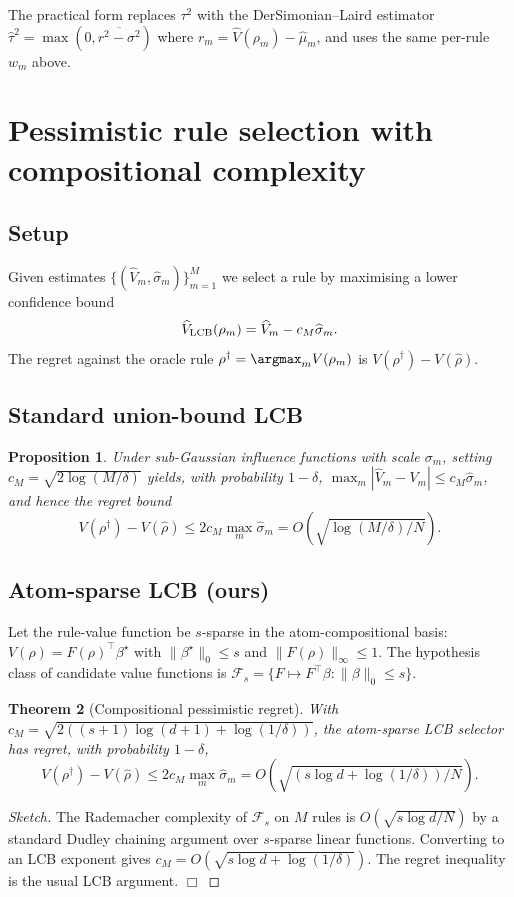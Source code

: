 \documentclass[11pt]{article}
\newtheorem{theorem}{Theorem}
\newtheorem{proposition}[theorem]{Proposition}
\begin{document}
The practical form replaces $\tau^2$ with the DerSimonian--Laird
estimator $\widehat\tau^2 = \max(0, \overline{r^2 - \sigma^2})$ where
$r_m = \widehat V(\rho_m) - \widehat\mu_m$, and uses the same
per-rule $w_m$ above.

\section{Pessimistic rule selection with compositional complexity}

\subsection{Setup}

Given estimates $\{(\widehat V_m, \widehat\sigma_m)\}_{m=1}^M$ we
select a rule by maximising a lower confidence bound
$$
\widehat V_{\rm LCB}(\rho_m) = \widehat V_m - c_M \widehat\sigma_m.
$$
The regret against the oracle rule $\rho^\dagger =
\argmax_m V(\rho_m)$ is $V(\rho^\dagger) - V(\widehat\rho)$.

\subsection{Standard union-bound LCB}

\begin{proposition}\label{prop:lcb-union}
Under sub-Gaussian influence functions with scale $\sigma_m$, setting
$c_M = \sqrt{2 \log(M/\delta)}$ yields, with probability $1 - \delta$,
$\max_m |\widehat V_m - V_m| \le c_M \widehat\sigma_m$, and hence the
regret bound
$$
V(\rho^\dagger) - V(\widehat\rho) \le 2 c_M \max_m \widehat\sigma_m = O\!\left(\sqrt{\log(M/\delta)/N}\right).
$$
\end{proposition}

\subsection{Atom-sparse LCB (ours)}

Let the rule-value function be $s$-sparse in the atom-compositional
basis: $V(\rho) = F(\rho)^\top \beta^\star$ with
$\|\beta^\star\|_0 \le s$ and $\|F(\rho)\|_\infty \le 1$.  The
hypothesis class of candidate value functions is
$\mathcal{F}_s = \{F \mapsto F^\top \beta : \|\beta\|_0 \le s\}$.

\begin{theorem}[Compositional pessimistic regret]\label{thm:comp-lcb}
With $c_M = \sqrt{2 ((s + 1) \log(d + 1) + \log(1/\delta))}$, the
atom-sparse LCB selector has regret, with probability $1-\delta$,
$$
V(\rho^\dagger) - V(\widehat\rho) \le 2 c_M \max_m \widehat\sigma_m
= O\!\left(\sqrt{(s \log d + \log(1/\delta))/N}\right).
$$
\end{theorem}
\begin{proof}[Sketch]
The Rademacher complexity of $\mathcal{F}_s$ on $M$ rules is
$O(\sqrt{s \log d / N})$ by a standard Dudley chaining argument over
$s$-sparse linear functions.  Converting to an LCB exponent gives
$c_M = O(\sqrt{s \log d + \log(1/\delta)})$.  The regret inequality is
the usual LCB argument.  $\Box$
\end{proof}
\end{document}
